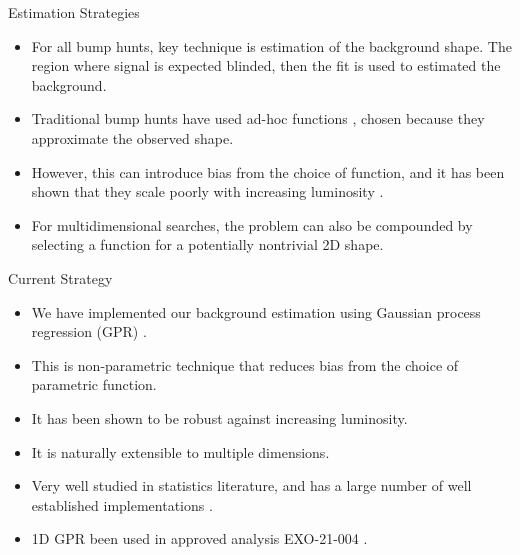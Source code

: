 \documentclass[10pt]{beamer}
\begin{document}
\begin{frame}{Estimation Strategies}
  \begin{splitcol}[0.55]
    \begin{col}
      \begin{itemize}
      \item For all bump hunts, key technique is estimation of the background shape. The region where signal is expected blinded, then the fit is used to estimated the background.
      \item Traditional bump hunts have used ad-hoc functions \cite{zisopoulos_parametric_2023}, chosen because they approximate the observed shape. 
      \item However, this can introduce bias from the choice of function, and it has been shown that they scale poorly with increasing luminosity \cite{frate_modeling_2017}.
      \item For multidimensional searches, the problem can also be compounded by selecting a function for a potentially nontrivial 2D shape. 
      \end{itemize}
    \end{col}

    \begin{col}
      \begin{center}
      \end{center}
    \end{col}
  \end{splitcol}
\end{frame}

\begin{frame}{Current Strategy}
  \begin{itemize}
  \item We have implemented our background estimation using Gaussian process regression (GPR) \cite{rasmussen_gaussian_2006}.
  \item This is non-parametric technique that reduces bias from the choice of parametric function.
  \item It has been shown to be robust against increasing luminosity\cite{frate_modeling_2017}.
  \item It is naturally extensible to multiple dimensions.
  \item Very well studied in statistics literature\cite{gardner_gpytorch_2021}, and has a large number of well established implementations \cite{noauthor_comparison_2024, gardner_gpytorch_2021}.
  \item 1D GPR been used in approved analysis EXO-21-004 \cite{cms_collaboration_searches_2024}.
  \end{itemize}
\end{frame}
\end{document}
